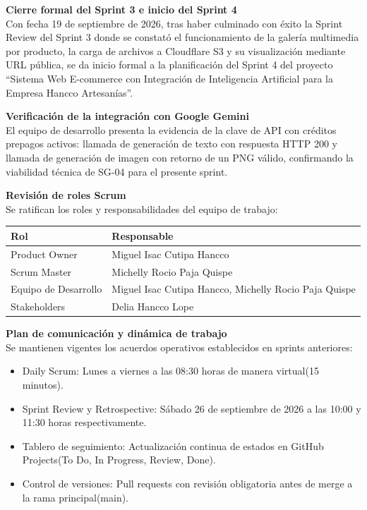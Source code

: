 \documentclass[12pt,a4paper]{article}
\begin{document}
\textbf{Cierre formal del Sprint 3 e inicio del Sprint 4}\\
Con fecha 19 de septiembre de 2026, tras haber culminado con éxito la Sprint Review del Sprint 3 donde se constató el funcionamiento de la galería multimedia por producto, la carga de archivos a Cloudflare S3 y su visualización mediante URL pública, se da inicio formal a la planificación del Sprint 4 del proyecto ``Sistema Web E-commerce con Integración de Inteligencia Artificial para la Empresa Hancco Artesanías''.

\textbf{Verificación de la integración con Google Gemini}\\
El equipo de desarrollo presenta la evidencia de la clave de API con créditos prepagos activos: llamada de generación de texto con respuesta HTTP 200 y llamada de generación de imagen con retorno de un PNG válido, confirmando la viabilidad técnica de SG-04 para el presente sprint.

\textbf{Revisión de roles Scrum}\\
Se ratifican los roles y responsabilidades del equipo de trabajo:

\begin{center}
\small
\begin{tabularx}{\textwidth}{p{5cm} L}
\toprule
\textbf{Rol} & \textbf{Responsable} \\
\midrule
Product Owner & Miguel Isac Cutipa Hancco \\
Scrum Master & Michelly Rocio Paja Quispe \\
Equipo de Desarrollo & Miguel Isac Cutipa Hancco, Michelly Rocio Paja Quispe \\
Stakeholders & Delia Hancco Lope \\
\bottomrule
\end{tabularx}
\end{center}

\textbf{Plan de comunicación y dinámica de trabajo}\\
Se mantienen vigentes los acuerdos operativos establecidos en sprints anteriores:

\begin{itemize}
    \item Daily Scrum: Lunes a viernes a las 08:30 horas de manera virtual(15 minutos).
    \item Sprint Review y Retrospective: Sábado 26 de septiembre de 2026 a las 10:00 y 11:30 horas respectivamente.
    \item Tablero de seguimiento: Actualización continua de estados en GitHub Projects(To Do, In Progress, Review, Done).
    \item Control de versiones: Pull requests con revisión obligatoria antes de merge a la rama principal(main).
\end{itemize}
\end{document}
